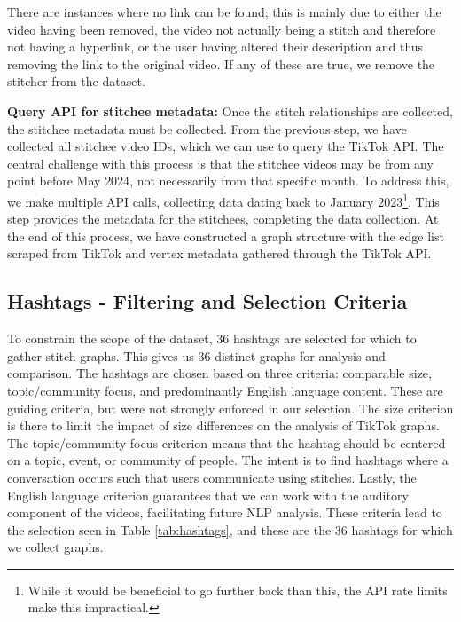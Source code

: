 There are instances where no link can be found; this is mainly due to either the video having been removed, the video not actually being a stitch and therefore not having a hyperlink, or the user having altered their description and thus removing the link to the original video. If any of these are true, we remove the stitcher from the dataset. 


\textbf{Query API for stitchee metadata:} Once the stitch relationships are collected, the stitchee metadata must be collected. From the previous step, we have collected all stitchee video IDs, which we can use to query the TikTok API. The central challenge with this process is that the stitchee videos may be from any point before May $2024$, not necessarily from that specific month. To address this, we make multiple API calls, collecting data dating back to January $2023$\footnote{While it would be beneficial to go further back than this, the API rate limits make this impractical.}. This step provides the metadata for the stitchees, completing the data collection. At the end of this process, we have constructed a graph structure with the edge list scraped from TikTok and vertex metadata gathered through the TikTok API.




\subsection{Hashtags - Filtering and Selection Criteria}\label{hashtag_groups}

To constrain the scope of the dataset, $36$ hashtags are selected for which to gather stitch graphs. This gives us $36$ distinct graphs for analysis and comparison. The hashtags are chosen based on three criteria: comparable size, topic/community focus, and predominantly English language content. These are guiding criteria, but were not strongly enforced in our selection. The size criterion is there to limit the impact of size differences on the analysis of TikTok graphs. The topic/community focus criterion means that the hashtag should be centered on a topic, event, or community of people. The intent is to find hashtags where a conversation occurs such that users communicate using stitches. Lastly, the English language criterion guarantees that we can work with the auditory component of the videos, facilitating future NLP analysis. These criteria lead to the selection seen in Table \ref{tab:hashtags}, and these are the $36$ hashtags for which we collect graphs. 

